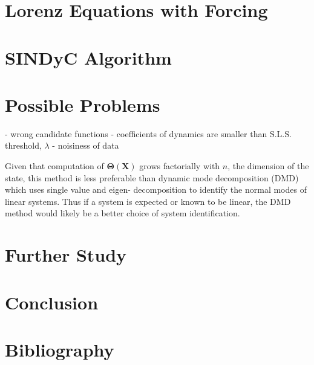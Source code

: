 \documentclass[12pt,preprintnumbers,amsmath,amssymb,titlepage]{report}
\begin{document}
\section*{Lorenz Equations with Forcing}

\section*{SINDyC Algorithm}

\section*{Possible Problems}
- wrong candidate functions
- coefficients of dynamics are smaller than S.L.S. threshold, $\lambda$
- noisiness of data


Given that computation of $\bm{\Theta}(\bm{X})$ grows factorially with $n$, the dimension of the state, this  method is less preferable than dynamic mode decomposition (DMD) which uses single value and eigen- decomposition to identify the normal modes of linear systems. Thus if a system is expected or known to be linear, the DMD method would likely be a better choice of system identification.





\section{Further Study}

\section*{Conclusion}

\section*{Bibliography}


\end{document}
